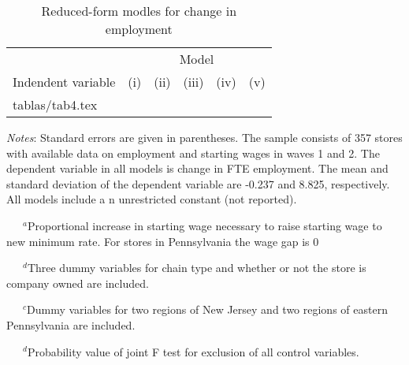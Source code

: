 \documentclass{article}
\makeatletter
\newcommand\primitiveinput[1]
{\@@input #1 }
\makeatother
\begin{document}
\begin{table}[H]
	\centering
	\label{tab:Table}
		\begin{threeparttable}
			\caption{Reduced-form modles for change in employment}
			\begin{tabular}{@{}l*{5}{c}@{}}
				\toprule
				& \multicolumn{5}{c}{Model}								\\ \cmidrule(l){2-6}
				Indendent variable & (i) & (ii) & (iii) & (iv) & (v) 	\\ \midrule
				\primitiveinput{tablas/tab4.tex}
				\bottomrule
			\end{tabular}
			\begin{tablenotes}
				\setlength{}
				\footnotesize
				\item \textit{Notes}: Standard errors are given in parentheses. 
				The sample consists of 357 stores with available data on employment and starting wages in waves 1 and 2. 
				The dependent variable in all models is change in FTE employment. The mean and standard deviation of 
				the dependent variable are -0.237 and 8.825, respectively. All models include a n unrestricted constant (not reported).
				\item ~~~$^{a}$Proportional increase in starting wage necessary to raise starting wage to new minimum rate. For stores in Pennsylvania the wage gap is 0
				\item ~~~$^{d}$Three dummy variables for chain type and whether or not the store is company owned are included.
				\item ~~~$^{c}$Dummy variables for two regions of New Jersey and two regions of eastern Pennsylvania are included.
				\item ~~~$^{d}$Probability value of joint F test for exclusion of all control variables.
			\end{tablenotes}
		\end{threeparttable}
\end{table}
\end{document}

